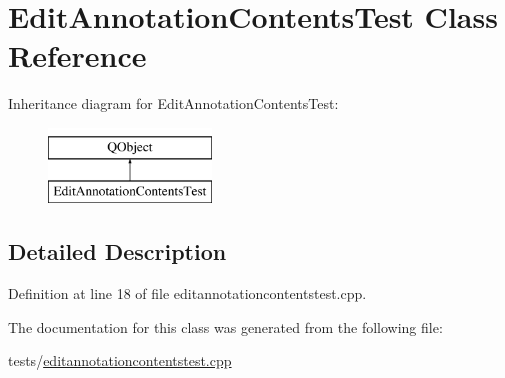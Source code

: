 \hypertarget{classEditAnnotationContentsTest}{\section{Edit\+Annotation\+Contents\+Test Class Reference}
\label{classEditAnnotationContentsTest}
}
Inheritance diagram for Edit\+Annotation\+Contents\+Test\+:\begin{figure}[H]
\begin{center}
\leavevmode
\includegraphics[height=2.000000cm]{classEditAnnotationContentsTest}
\end{center}
\end{figure}


\subsection{Detailed Description}


Definition at line 18 of file editannotationcontentstest.\+cpp.



The documentation for this class was generated from the following file\+:\begin{DoxyCompactItemize}
\item 
tests/\hyperlink{editannotationcontentstest_8cpp}{editannotationcontentstest.\+cpp}\end{DoxyCompactItemize}
